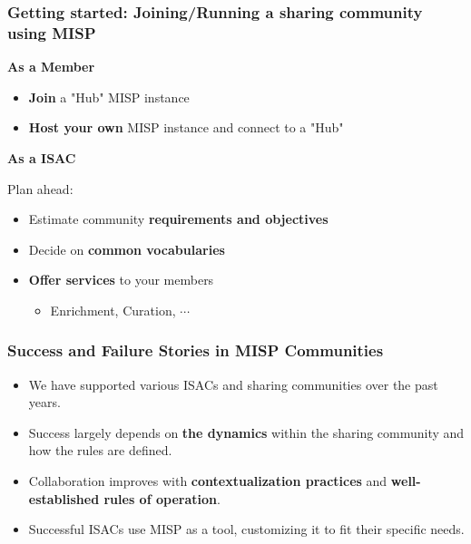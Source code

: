 \begin{frame}
    \frametitle{Getting started: Joining/Running a sharing community using MISP}

    \begin{minipage}[t]{0.5\textwidth}
        \begin{center}
            \bf \Large As a Member
        \end{center}
        \begin{itemize}
            \item \textbf{Join} a "Hub" MISP instance
            \item \textbf{Host your own} MISP instance and connect to a "Hub"
        \end{itemize}
    \end{minipage}%
    \begin{minipage}[t]{0.5\textwidth}
        \begin{center}
            \bf \Large As a ISAC
        \end{center}
        Plan ahead:
        \begin{itemize}
            \item Estimate community \textbf{requirements and objectives}
            \item Decide on \textbf{common vocabularies}
            \item \textbf{Offer services} to your members
            \begin{itemize}
                \item Enrichment, Curation, $\cdots$
            \end{itemize}
        \end{itemize}
    \end{minipage}%
\end{frame}

\begin{frame}
    \frametitle{Success and Failure Stories in MISP Communities}
    \begin{itemize}
        \item We have supported various ISACs and sharing communities over the past years.
	\item Success largely depends on {\bf the dynamics} within the sharing community and how the rules are defined.
	\item Collaboration improves with {\bf contextualization practices} and {\bf well-established rules of operation}.
        \item Successful ISACs use MISP as a tool, customizing it to fit their specific needs.
    \end{itemize}
\end{frame}

